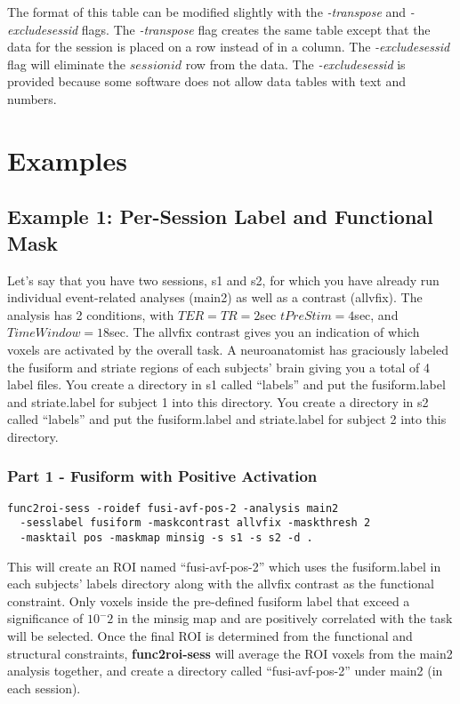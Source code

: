 \documentclass[10pt]{article}
\begin{document}
The format of this table can be modified slightly with the {\em
-transpose} and {\em -excludesessid} flags. The {\em
-transpose} flag creates the same table except that the data for the
session is placed on a row instead of in a column. The {\em
-excludesessid} flag will eliminate the $session id$ row from the
data. The {\em -excludesessid} is provided because some software does
not allow data tables with text and numbers.

\section{Examples}

\subsection{Example 1: Per-Session Label and Functional Mask}

Let's say that you have two sessions, s1 and s2, for which you have
already run individual event-related analyses (main2) as well as a
contrast (allvfix). The analysis has 2 conditions, with $TER=TR=2$sec
$tPreStim=4$sec, and $TimeWindow=18$sec. The allvfix contrast gives
you an indication of which voxels are activated by the overall task.
A neuroanatomist has graciously labeled the fusiform and striate
regions of each subjects' brain giving you a total of 4 label files.
You create a directory in s1 called ``labels'' and put the
fusiform.label and striate.label for subject 1 into this
directory. You create a directory in s2 called ``labels'' and put the
fusiform.label and striate.label for subject 2 into this directory.

\subsubsection{Part 1 - Fusiform with Positive Activation}

\begin{verbatim}
func2roi-sess -roidef fusi-avf-pos-2 -analysis main2
  -sesslabel fusiform -maskcontrast allvfix -maskthresh 2
  -masktail pos -maskmap minsig -s s1 -s s2 -d . 
\end{verbatim}

This will create an ROI named ``fusi-avf-pos-2'' which uses the
fusiform.label in each subjects' labels directory along with the
allvfix contrast as the functional constraint.  Only voxels inside the
pre-defined fusiform label that exceed a significance of $10^-2$ in
the minsig map and are positively correlated with the task will be
selected.  Once the final ROI is determined from the functional and
structural constraints, {\bf func2roi-sess} will average the ROI voxels
from the main2 analysis together, and create a directory called
``fusi-avf-pos-2'' under main2 (in each session).
\end{document}
